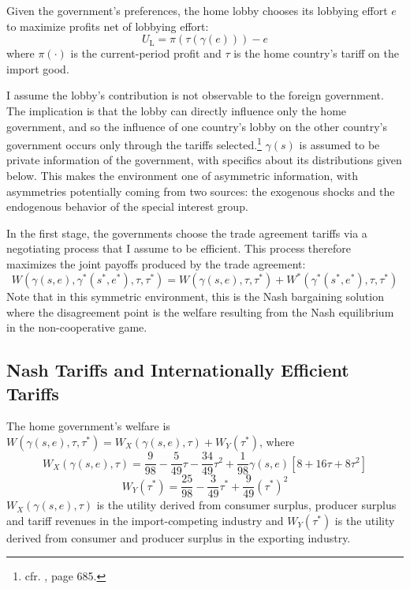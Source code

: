 \documentclass[12pt]{article}
\newcommand{\ga}{\gamma}
\begin{document}

Given the government's preferences, the home lobby chooses its lobbying effort $e$ to maximize profits net of lobbying effort:
\begin{equation}
  U_\text{L} = \pi(\tau(\ga(e))) - e
  \label{eq:lv3}
\end{equation}
where $\pi(\cdot)$ is the current-period profit and $\tau$ is the home country's tariff on the import good. %

I assume the lobby's contribution is not observable to the foreign government. The implication is that the lobby can directly influence only the home government, and so the influence of one country's lobby on the other country's government occurs only through the tariffs selected.\footnote{cfr. \Textcite{gh95}, page 685.} $\ga(s)$ is assumed to be private information of the government, with specifics about its distributions given below. This makes the environment one of asymmetric information, with asymmetries potentially coming from two sources: the exogenous shocks and the endogenous behavior of the special interest group.

In the first stage, the governments choose the trade agreement tariffs via a negotiating process that I assume to be efficient. This process therefore maximizes the joint payoffs produced by the trade agreement:
\begin{equation}
  W(\ga(s,e),\ga^*(s^*,e^*),\tau,\tau^*) = W(\ga(s,e),\tau,\tau^*) + W^*(\ga^*(s^*,e^*),\tau,\tau^*)
  \label{eq:jv}
\end{equation}
Note that in this symmetric environment, this is the Nash bargaining solution where the disagreement point is the welfare resulting from the Nash equilibrium in the non-cooperative game.


\subsection{Nash Tariffs and Internationally Efficient Tariffs}
\label{sec:nasheff}
The home government's welfare is $W(\ga(s,e),\tau,\tau^*) = W_X(\ga(s,e),\tau) +W_Y(\tau^*)$, where
\[
  W_X(\ga(s,e),\tau) = \frac{9}{98} - \frac{5}{49}\tau - \frac{34}{49}\tau^2 +\frac{1}{98}\ga(s,e)\left[ 8 + 16\tau + 8\tau^2 \right]
\]
\[
  W_Y(\tau^*) = \frac{25}{98} - \frac{3}{49}\tau^* + \frac{9}{49}(\tau^*)^2 
\]
$W_X(\ga(s,e),\tau)$ is the utility derived from consumer surplus, producer surplus and tariff revenues in the import-competing industry and $W_Y(\tau^*)$ is the utility derived from consumer and producer surplus in the exporting industry.
\end{document}
